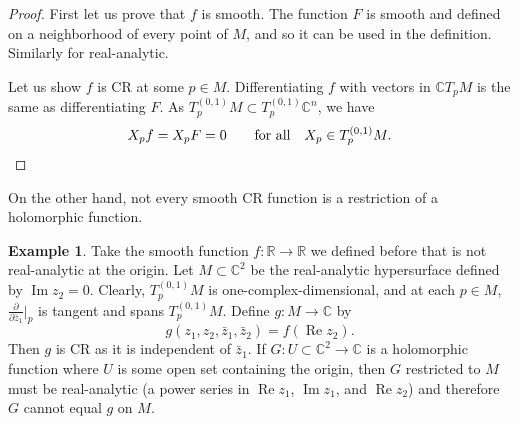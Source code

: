 \documentclass[12pt,openany]{book}
\renewcommand{\Re}{\operatorname{Re}}
\renewcommand{\Im}{\operatorname{Im}}
\newcommand{\C}{{\mathbb{C}}}
\newcommand{\R}{{\mathbb{R}}}
\theoremstyle{plain}
\theoremstyle{remark}
\theoremstyle{definition}
\theoremstyle{exercise}
\theoremstyle{example}
\newtheorem{example}[thm]{Example}
\begin{document}
\begin{proof}
First let us prove that $f$ is smooth.  The function $F$ is smooth and
defined on a neighborhood of every point of $M$, and so it can be used in the
definition.
Similarly for real-analytic.

Let us show $f$ is CR at some $p \in M$.
Differentiating $f$ with vectors in $\C T_pM$
is the same as differentiating $F$.
As $T_p^{(0,1)} M \subset T_p^{(0,1)} \C^n$, we have
\begin{equation*}
X_p f = X_p F = 0 \qquad \text{for all} \quad X_p \in T_p^{(0,1)} M.
\qedhere
\end{equation*}
\end{proof}

On the other hand, not every smooth CR function is a restriction of a holomorphic function.

\begin{example}
Take the smooth function $f \colon \R \to \R$ we defined before
that is not real-analytic at the origin.
Let $M \subset \C^2$ be the real-analytic hypersurface defined by
$\Im z_2 = 0$.
Clearly,
$T_p^{(0,1)} M$ is one-complex-dimensional, and at each $p \in M$,
$\frac{\partial}{\partial \bar{z}_1}\big|_p$ is tangent and spans
$T_p^{(0,1)} M$.  Define $g \colon M \to \C$ by
\begin{equation*}
g(z_1,z_2,\bar{z}_1,\bar{z}_2) = f(\Re z_2) .
\end{equation*}
Then $g$ is CR as it is independent of $\bar{z}_1$.
If $G \colon U \subset \C^2 \to \C$ is a holomorphic
function where $U$ is some open set containing the origin, then $G$
restricted to $M$ must be real-analytic (a power series in $\Re z_1$, $\Im
z_1$, and $\Re z_2$) and therefore $G$ cannot equal
$g$ on $M$.
\end{example}
\end{document}

